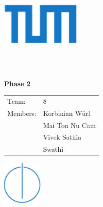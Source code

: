\begin{titlepage}
  \centering

  \includegraphics[width=40mm]{logos/tum}

  \vspace{5mm}
  {\huge\MakeUppercase{\getFaculty{}}}\\

  \vspace{5mm}
  {\large\MakeUppercase{\getUniversity{}}}\\

  \vspace{15mm}
  {\huge\bfseries \getTitle{}}

  \vspace{10mm}
  {\huge\bfseries Phase 2}

  \vspace{15mm}
  \begin{tabular}{l l}
    Team: & 8 \\
    Members:  & Korbinian Würl \\
              & Mai Ton Nu Cam \\
              & Vivek Sathia \\
              & Swathi
  \end{tabular}

  \vspace{20mm}
  \includegraphics[width=20mm]{logos/faculty}
\end{titlepage}
